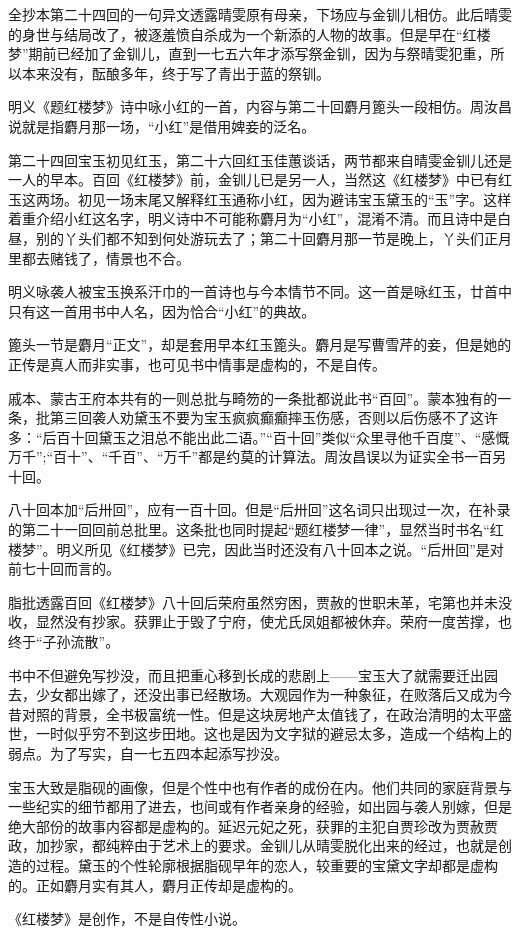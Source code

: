 \par 全抄本第二十四回的一句异文透露晴雯原有母亲，下场应与金钏儿相仿。此后晴雯的身世与结局改了，被逐羞愤自杀成为一个新添的人物的故事。但是早在“红楼梦”期前已经加了金钏儿，直到一七五六年才添写祭金钏，因为与祭晴雯犯重，所以本来没有，酝酿多年，终于写了青出于蓝的祭钏。
\par 明义《题红楼梦》诗中咏小红的一首，内容与第二十回麝月篦头一段相仿。周汝昌说就是指麝月那一场，“小红”是借用婢妾的泛名。
\par 第二十四回宝玉初见红玉，第二十六回红玉佳蕙谈话，两节都来自晴雯金钏儿还是一人的早本。百回《红楼梦》前，金钏儿已是另一人，当然这《红楼梦》中已有红玉这两场。初见一场末尾又解释红玉通称小红，因为避讳宝玉黛玉的“玉”字。这样着重介绍小红这名字，明义诗中不可能称麝月为“小红”，混淆不清。而且诗中是白昼，别的丫头们都不知到何处游玩去了；第二十回麝月那一节是晚上，丫头们正月里都去赌钱了，情景也不合。
\par 明义咏袭人被宝玉换系汗巾的一首诗也与今本情节不同。这一首是咏红玉，廿首中只有这一首用书中人名，因为恰合“小红”的典故。
\par 篦头一节是麝月“正文”，却是套用早本红玉篦头。麝月是写曹雪芹的妾，但是她的正传是真人而非实事，也可见书中情事是虚构的，不是自传。
\par 戚本、蒙古王府本共有的一则总批与畸笏的一条批都说此书“百回”。蒙本独有的一条，批第三回袭人劝黛玉不要为宝玉疯疯癫癫摔玉伤感，否则以后伤感不了这许多：“后百十回黛玉之泪总不能出此二语。”“百十回”类似“众里寻他千百度”、“感慨万千”;“百十”、“千百”、“万千”都是约莫的计算法。周汝昌误以为证实全书一百另十回。
\par 八十回本加“后卅回”，应有一百十回。但是“后卅回”这名词只出现过一次，在补录的第二十一回回前总批里。这条批也同时提起“题红楼梦一律”，显然当时书名“红楼梦”。明义所见《红楼梦》已完，因此当时还没有八十回本之说。“后卅回”是对前七十回而言的。
\par 脂批透露百回《红楼梦》八十回后荣府虽然穷困，贾赦的世职未革，宅第也并未没收，显然没有抄家。获罪止于毁了宁府，使尤氏凤姐都被休弃。荣府一度苦撑，也终于“子孙流散”。
\par 书中不但避免写抄没，而且把重心移到长成的悲剧上——宝玉大了就需要迁出园去，少女都出嫁了，还没出事已经散场。大观园作为一种象征，在败落后又成为今昔对照的背景，全书极富统一性。但是这块房地产太值钱了，在政治清明的太平盛世，一时似乎穷不到这步田地。这也是因为文字狱的避忌太多，造成一个结构上的弱点。为了写实，自一七五四本起添写抄没。
\par 宝玉大致是脂砚的画像，但是个性中也有作者的成份在内。他们共同的家庭背景与一些纪实的细节都用了进去，也间或有作者亲身的经验，如出园与袭人别嫁，但是绝大部份的故事内容都是虚构的。延迟元妃之死，获罪的主犯自贾珍改为贾赦贾政，加抄家，都纯粹由于艺术上的要求。金钏儿从晴雯脱化出来的经过，也就是创造的过程。黛玉的个性轮廓根据脂砚早年的恋人，较重要的宝黛文字却都是虚构的。正如麝月实有其人，麝月正传却是虚构的。
\par 《红楼梦》是创作，不是自传性小说。
\par {}

